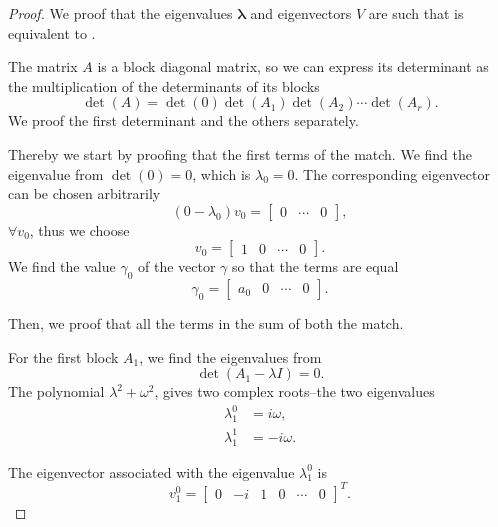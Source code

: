 \begin{proof}
We proof that the eigenvalues $\mathbf{\lambda}$ and eigenvectors $V$ are such that  is equivalent to .

The matrix $A$ is a block diagonal matrix, so we can express its determinant as the multiplication of the determinants of its blocks
\begin{equation}
  \det{(A)}=\det{(0)}\det{(A_1)}\det{(A_2)}\cdots\det{(A_r)}.
\end{equation}
We proof the first determinant and the others separately.

Thereby we start by proofing that the first terms of the  match. We find the eigenvalue from $\det(0)=0$, which is $\lambda_0=0$. The corresponding eigenvector can be chosen arbitrarily
\begin{equation}
  (0-\lambda_0)v_0=\begin{bmatrix} 0 & \cdots & 0 \end{bmatrix},
\end{equation}
$\forall v_0$, thus we choose
\begin{equation}
  v_0=\begin{bmatrix}1 & 0 & \cdots & 0\end{bmatrix}.
\end{equation} 
We find the value $\gamma_0$ of the vector $\gamma$ so that the terms are equal 
\begin{equation}
  \gamma_0=\begin{bmatrix}a_0 & 0 & \cdots & 0\end{bmatrix}.
\end{equation} 

Then, we proof that all the terms in the sum of both the  match. 

For the first block $A_1$, we find the eigenvalues from 
\begin{equation}
  \det(A_1-\lambda I)=0.
\end{equation}
The polynomial $\lambda^2+\omega^2$, gives two complex roots--the two eigenvalues
\begin{subequations}\begin{align}
  \lambda_1^0&=i\omega,\\
  \lambda_1^1&=-i\omega.
\end{align}
\end{subequations}

The eigenvector associated with the eigenvalue $\lambda_1^0$ is 
\begin{equation}
  v_1^0=\begin{bmatrix}0 & -i&1&0&\cdots&0\end{bmatrix}^T.  
\end{equation}


\end{proof}
